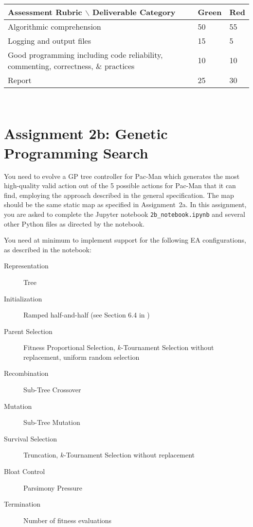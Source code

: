 \documentclass{article}
\begin{document}
\\
\begin{tabular}{l|l|l}
    Assessment Rubric $\backslash$ Deliverable Category & Green & Red\\ \hline \hline
	Algorithmic comprehension                                       & 50 & 55 \\
	\hline Logging and output files            & 15 & 5 \\
	\hline Good programming including code reliability, commenting, correctness, \& practices & 10 & 10\\
	\hline Report        & 25 & 30 \\
\end{tabular}\\

\newpage

\section*{Assignment 2b: Genetic Programming Search}
You need to evolve a GP tree controller for Pac-Man which generates the most high-quality valid action out of the 5 possible actions for Pac-Man that it can find, employing the approach described in the general specification. The map should be the same static map as specified in Assignment~2a. In this assignment, you are asked to complete the Jupyter notebook \texttt{2b\_notebook.ipynb} and several other Python files as directed by the notebook.

You need at minimum to implement support for the following EA configurations, as described in the notebook:
\begin{description}
\item[Representation] Tree
\item[Initialization] Ramped half-and-half (see Section 6.4 in \cite{Eiben2015})
\item[Parent Selection] Fitness Proportional Selection, $k$-Tournament Selection without replacement, uniform random selection
\item[Recombination] Sub-Tree Crossover
\item[Mutation] Sub-Tree Mutation
\item[Survival Selection] Truncation, $k$-Tournament Selection without replacement
\item[Bloat Control] Parsimony Pressure
\item[Termination] Number of fitness evaluations
\end{description}
\end{document}
